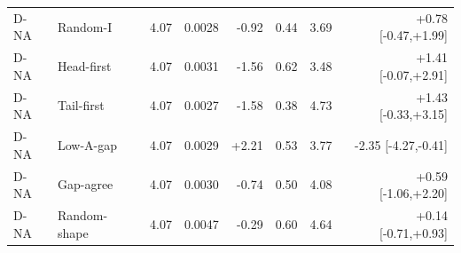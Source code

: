 \begin{table}[htbp]
\begin{tabular}{llrrrrrr}
D-NA & Random-I & 4.07 & 0.0028 & -0.92 & 0.44 & 3.69 & +0.78 [-0.47,+1.99]\\
D-NA & Head-first & 4.07 & 0.0031 & -1.56 & 0.62 & 3.48 & +1.41 [-0.07,+2.91]\\
D-NA & Tail-first & 4.07 & 0.0027 & -1.58 & 0.38 & 4.73 & +1.43 [-0.33,+3.15]\\
D-NA & Low-A-gap & 4.07 & 0.0029 & +2.21 & 0.53 & 3.77 & -2.35 [-4.27,-0.41]\\
D-NA & Gap-agree & 4.07 & 0.0030 & -0.74 & 0.50 & 4.08 & +0.59 [-1.06,+2.20]\\
D-NA & Random-shape & 4.07 & 0.0047 & -0.29 & 0.60 & 4.64 & +0.14 [-0.71,+0.93]\\
\bottomrule
\end{tabular}
\end{table}
